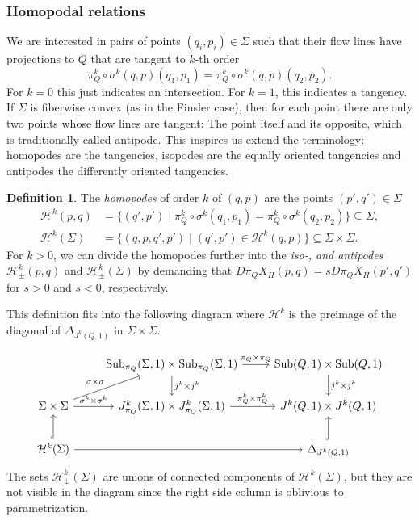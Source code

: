 \documentclass{amsart}
\newcommand{\Hcal}{{\mathcal{H}}}
\newcommand{\Sub}{\operatorname{Sub}}
\theoremstyle{definition}
\newtheorem{definition}[proposition]{Definition}
\theoremstyle{remark}
\numberwithin{equation}{section}
\begin{document}



\subsubsection{Homopodal relations}
We are interested in pairs of points $(q_i,p_i)\in\Sigma$ such that their flow lines have projections to $Q$ that are tangent to $k$-th order
$$\pi_Q^k\circ \sigma^k(q,p)(q_1,p_1)=\pi_Q^k\circ \sigma^k(q,p)(q_2,p_2).$$
For $k=0$ this just indicates an intersection. For $k=1$, this indicates a tangency. If $\Sigma$ is fiberwise convex (as in the Finsler case), then for each point there are only two points whose flow lines are tangent: The point itself and its opposite, which is traditionally called antipode. This inspires us extend the terminology: homopodes are the tangencies, isopodes are the equally oriented tangencies and antipodes the differently oriented tangencies. 

\begin{definition}
    The \emph{homopodes} of order $k$ of $(q,p)$ are the points $(p',q')\in\Sigma$
    \begin{align*}
         \Hcal^k(p,q)&=\{(q',p')\mid \pi_Q^k\circ \sigma^k(q_1,p_1)=\pi_Q^k\circ \sigma^k(q_2,p_2)\}\subseteq\Sigma,\\
         \Hcal^k(\Sigma)&=\{(q,p,q',p')\mid (q',p')\in \Hcal^k(q,p)\}\subseteq \Sigma\times\Sigma.
    \end{align*} 
    For $k>0$, we can divide the homopodes further into the \emph{iso-, and antipodes} $\Hcal^k_\pm(p,q)$ and $\Hcal^k_\pm(\Sigma)$ by demanding that $D\pi_QX_H(p,q)=sD\pi_QX_H(p',q')$ for $s>0$ and $s<0$, respectively.
\end{definition}

This definition fits into the following diagram where $\Hcal^k$ is the preimage of the diagonal of $\Delta_{J^k(Q,1)}$ in $\Sigma\times\Sigma$.

\begin{equation}\label{eq:Diagram}    
  \begin{tikzcd}
    &\Sub_{\pi_Q}(\Sigma,1)\times\Sub_{\pi_Q}(\Sigma,1) \arrow{r}{\pi_Q\times\pi_Q}\arrow{d}{j^k\times j^k} &\Sub(Q,1)\times\Sub(Q,1)\arrow{d}{j^k\times j^k}  \\ 
    \Sigma\times\Sigma \arrow{ur}{\sigma\times\sigma} \arrow{r}{\sigma^k\times\sigma^k} & J^k_{\pi_Q}(\Sigma,1)\times J^k_{\pi_Q}(\Sigma,1) \arrow{r}{\pi^k_Q\times\pi^k_Q}& J^k(Q,1)\times J^k(Q,1)\\
     \Hcal^k(\Sigma) \ar[u,hook] \arrow{rr} & & \Delta_{J^k(Q,1)} \ar[u,hook]
  \end{tikzcd}
\end{equation}
The sets $\Hcal^k_\pm(\Sigma)$ are unions of connected components of $\Hcal^k(\Sigma)$, but they are not visible in the diagram since the right side column is oblivious to parametrization. 
\end{document}
